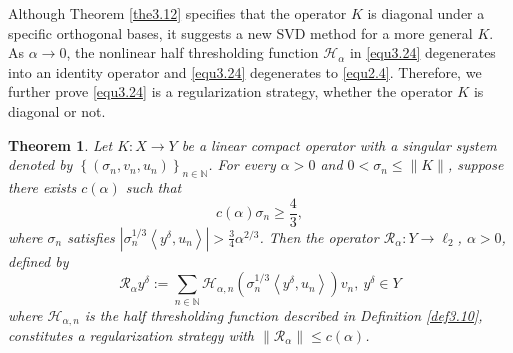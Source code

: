 \documentclass[a4paper,12pt]{article}
\newtheorem{theorem}{Theorem}[section]
\numberwithin{equation}{section}
\begin{document}
\par Although Theorem \ref{the3.12} specifies that the operator $K$ is diagonal under a specific orthogonal bases, it suggests a new SVD method for a more general $K$. As $\alpha\rightarrow 0$, the nonlinear half thresholding function $\mathcal{H}_{\alpha}$ in \eqref{equ3.24} degenerates into an identity operator and \eqref{equ3.24} degenerates to \eqref{equ2.4}. Therefore, we further prove \eqref{equ3.24} is a regularization strategy, whether the operator $K$ is diagonal or not.

\begin{theorem}\label{the3.13}
    Let $K: X\rightarrow Y$ be a linear compact operator with a singular system denoted by $\left\{\left(\sigma_{n},v_{n},u_{n}\right)\right\}_{n\in\mathbb{N}}$. For every $\alpha>0$ and $0<\sigma_{n}\leq\|K\|$, suppose there exists $c(\alpha)$ such that
    \begin{equation*}
        c(\alpha)\sigma_{n}\geq \frac{4}{3},
    \end{equation*} 
    where $\sigma_{n}$ satisfies $\left|\sigma_{n}^{1/3}\left<y^{\delta},u_{n}\right>\right|>\frac{3}{4}\alpha^{2/3}$. Then the operator $\mathcal{R}_{\alpha}:Y\rightarrow \ell_{2}$, $\alpha>0$, defined by
    \begin{equation*}
        \mathcal{R}_{\alpha}y^{\delta}:=\sum_{n\in\mathbb{N}}\mathcal{H}_{\alpha,n}(\sigma_{n}^{1/3}\left<y^{\delta}, u_{n}\right>)v_{n},
        \ y^{\delta}\in Y
    \end{equation*}
     where $\mathcal{H}_{\alpha,n}$ is the half thresholding function described in  Definition \ref{def3.10}, constitutes a regularization strategy with $\|\mathcal{R}_{\alpha}\|\leq c(\alpha)$.
\end{theorem}
\end{document}
